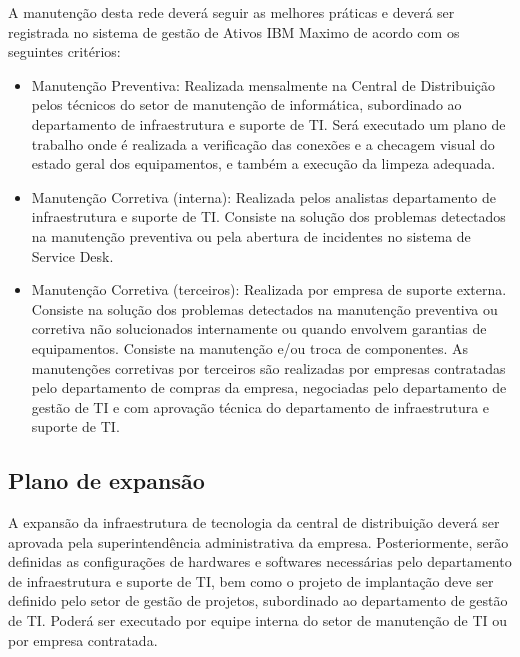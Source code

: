 \documentclass[	DIV=calc,%
							paper=a4,%
							fontsize=12pt,%
							onecolumn]{scrartcl}	 					%
\begin{document}
A manutenção desta rede deverá seguir as melhores práticas e deverá ser registrada no sistema de gestão de Ativos IBM Maximo de acordo com os seguintes critérios: 
\begin{itemize}
	\item Manutenção Preventiva: Realizada mensalmente na Central de Distribuição pelos técnicos do setor de manutenção de informática, subordinado ao departamento de infraestrutura e suporte de TI. Será executado um plano de trabalho onde é realizada a verificação das conexões e a checagem visual do estado geral dos equipamentos, e também a execução da limpeza adequada. 
	\item Manutenção Corretiva (interna): Realizada pelos analistas departamento de infraestrutura e suporte de TI. Consiste na solução dos problemas detectados na manutenção preventiva ou pela abertura de incidentes no sistema de Service Desk.
	\item Manutenção Corretiva (terceiros): Realizada por empresa de suporte externa. Consiste na solução dos problemas detectados na manutenção preventiva ou corretiva não solucionados internamente ou quando envolvem garantias de equipamentos. Consiste na manutenção e/ou troca de componentes. As manutenções corretivas por terceiros são realizadas por empresas contratadas pelo departamento de compras da empresa, negociadas pelo departamento de gestão de TI e com aprovação técnica do departamento de infraestrutura e suporte de TI.
\end{itemize}

\subsection{Plano de expansão}

A expansão da infraestrutura de tecnologia da central de distribuição deverá ser aprovada pela superintendência administrativa da empresa. Posteriormente, serão definidas as configurações de hardwares e softwares necessárias pelo departamento de infraestrutura e suporte de TI, bem como o projeto de implantação deve ser definido pelo setor de gestão de projetos, subordinado ao departamento de gestão de TI. Poderá ser executado por equipe interna do setor de manutenção de TI ou por empresa contratada. 
\end{document}
